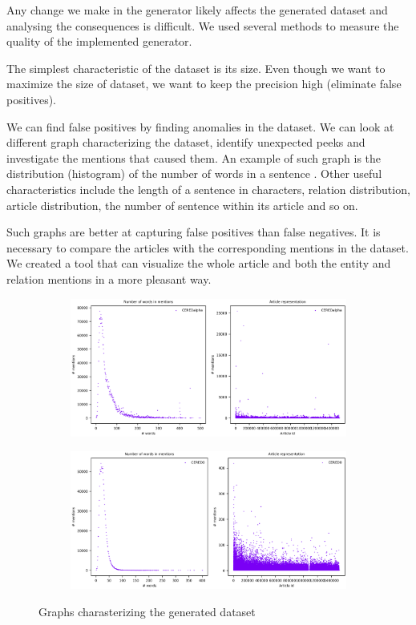 Any change we make in the generator likely affects the generated dataset and analysing the consequences is difficult. We used several methods to measure the quality of the implemented generator.

The simplest characteristic of the dataset is its size. Even though we want to maximize the size of dataset, we want to keep the precision high (eliminate false positives).

We can find false positives by finding anomalies in the dataset. We can look at different graph characterizing the dataset, identify unexpected peeks and investigate the mentions that caused them. An example of such graph is the distribution (histogram) of the number of words in a sentence . Other useful characteristics include the length of a sentence in characters, relation distribution, article distribution, the number of sentence within its article and so on.

Such graphs are better at capturing false positives than false negatives. It is necessary to compare the articles with the corresponding mentions in the dataset. We created a tool that can visualize the whole article and both the entity and relation mentions in a more pleasant way.

\begin{figure}
\begin{subfigure}{1\textwidth}
\centering
\includegraphics[width = 1\textwidth]{./img/Histograms_2020-07-19_21-00-53_CEREDalpha.png}
\end{subfigure}
\begin{subfigure}{1\textwidth}
\centering
\includegraphics[width = 1\textwidth]{./img/Histograms_2020-07-19_21-00-53_CERED0.png}
\end{subfigure}
\caption{Graphs charasterizing the generated dataset}

\end{figure}

